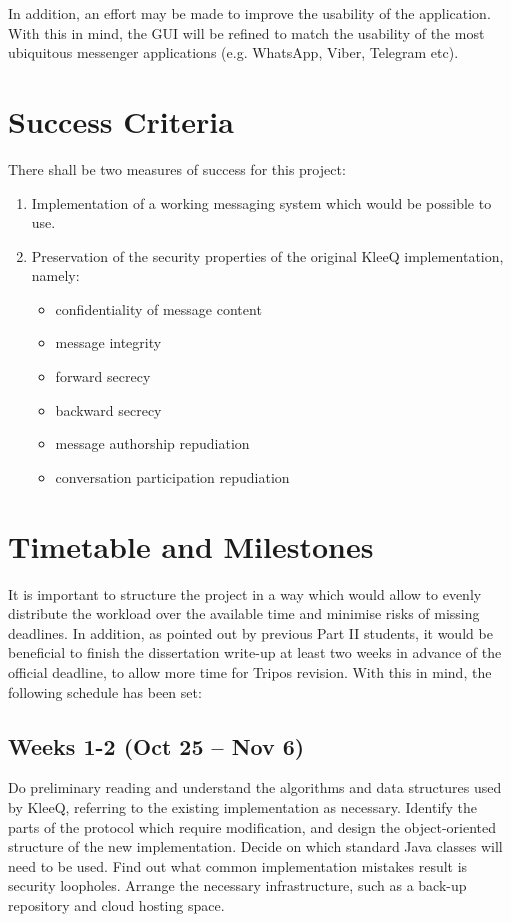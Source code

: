 \documentclass[a4paper, 12pt]{report}
\begin{document}
\begin{appendices}
\vspace{\baselineskip}
\noindent
In addition, an effort may be made to improve the usability of the application. With this in mind, the GUI will be refined to match the usability of the most ubiquitous messenger applications (e.g. WhatsApp, Viber, Telegram etc).




\section{Success Criteria}
There shall be two measures of success for this project:
\begin{enumerate}
    \item Implementation of a working messaging system which would be possible to use.
    \item Preservation of the security properties of the original KleeQ implementation, namely:
        \begin{itemize}
            \item confidentiality of message content
            \item message integrity
            \item forward secrecy
            \item backward secrecy
            \item message authorship repudiation
            \item conversation participation repudiation
        \end{itemize}
\end{enumerate}




\section{Timetable and Milestones}
It is important to structure the project in a way which would allow to evenly distribute the workload over the available time and minimise risks of missing deadlines. In addition, as pointed out by previous Part II students, it would be beneficial to finish the dissertation write-up at least two weeks in advance of the official deadline, to allow more time for Tripos revision. With this in mind, the following schedule has been set:


\subsection*{Weeks 1-2 (Oct 25 -- Nov 6)}
Do preliminary reading and understand the algorithms and data structures used by KleeQ, referring to the existing implementation as necessary. Identify the parts of the protocol which require modification, and design the object-oriented structure of the new implementation. Decide on which standard Java classes will need to be used. Find out what common implementation mistakes result is security loopholes. Arrange the necessary infrastructure, such as a back-up repository and cloud hosting space.


\end{appendices}
\end{document}
